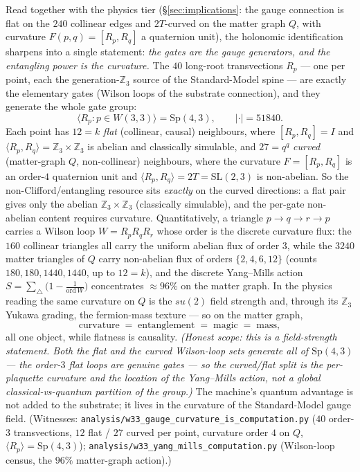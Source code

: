 \documentclass[11pt]{article}
\begin{document}
Read together with the physics tier (\S\ref{sec:implications}: the gauge
connection is flat on the $240$ collinear edges and $2T$-curved on the matter
graph $Q$, with curvature $F(p,q)=[R_p,R_q]$ a quaternion unit), the holonomic
identification sharpens into a single statement: \emph{the gates are the gauge
generators, and the entangling power is the curvature.} The $40$ long-root
transvections $R_p$ --- one per point, each the generation-$\mathbb Z_3$ source
of the Standard-Model spine --- are exactly the elementary gates (Wilson loops
of the substrate connection), and they generate the whole gate group:
\[
  \langle R_p : p\in W(3,3)\rangle=\mathrm{Sp}(4,3),\qquad |{\cdot}|=51840 .
\]
Each point has $12=k$ \emph{flat} (collinear, causal) neighbours, where
$[R_p,R_q]=I$ and $\langle R_p,R_q\rangle=\mathbb Z_3\times\mathbb Z_3$ is abelian
and classically simulable, and $27=q^q$ \emph{curved} (matter-graph $Q$,
non-collinear) neighbours, where the curvature $F=[R_p,R_q]$ is an order-$4$
quaternion unit and $\langle R_p,R_q\rangle=2T=\mathrm{SL}(2,3)$ is non-abelian.
So the non-Clifford/entangling resource sits \emph{exactly} on the curved
directions: a flat pair gives only the abelian $\mathbb Z_3\times\mathbb Z_3$
(classically simulable), and the per-gate non-abelian content requires curvature.
Quantitatively, a triangle $p{\to}q{\to}r{\to}p$ carries a Wilson loop
$W=R_pR_qR_r$ whose order is the discrete curvature flux: the $160$ collinear
triangles all carry the uniform abelian flux of order $3$, while the $3240$
matter triangles of $Q$ carry non-abelian flux of orders $\{2,4,6,12\}$ (counts
$180,180,1440,1440$, up to $12=k$), and the discrete Yang--Mills action
$S=\sum_{\triangle}\bigl(1-\tfrac1{\mathrm{ord}\,W}\bigr)$ concentrates
$\approx 96\%$ on the matter graph. In the physics reading the same curvature on
$Q$ is the $su(2)$ field strength and, through its $\mathbb Z_3$ Yukawa grading,
the fermion-mass texture --- so on the matter graph,
\[
  \text{curvature}\;=\;\text{entanglement}\;=\;\text{magic}\;=\;\text{mass},
\]
all one object, while flatness is causality. \emph{(Honest scope: this is a
field-strength statement. Both the flat and the curved Wilson-loop \emph{sets}
generate all of $\mathrm{Sp}(4,3)$ --- the order-$3$ flat loops are genuine gates
--- so the curved/flat split is the per-plaquette curvature and the location of
the Yang--Mills action, not a global classical-vs-quantum partition of the group.)}
The machine's quantum advantage is not added to the substrate; it lives in the
curvature of the Standard-Model gauge field. (Witnesses:
\texttt{analysis/w33\_gauge\_curvature\_is\_computation.py} ($40$ order-$3$
transvections, $12$ flat / $27$ curved per point, curvature order $4$ on $Q$,
$\langle R_p\rangle=\mathrm{Sp}(4,3)$);
\texttt{analysis/w33\_yang\_mills\_computation.py} (Wilson-loop census, the
$96\%$ matter-graph action).)
\end{document}
